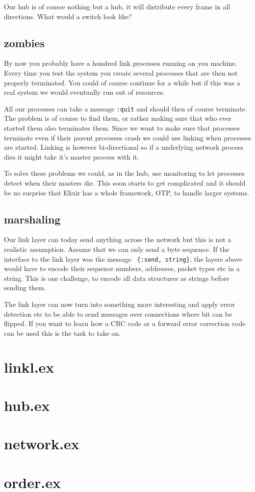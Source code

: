 \documentclass[a4paper,11pt]{article}
\begin{document}
Our hub is of course nothing but a hub, it will distribute every frame
in all directions. What would a switch look like?

\subsection{zombies}

By now you probably have a hundred link processes running on you
machine. Every time you test the system you create several processes
that are then not properly terminated. You could of course continue
for a while but if this was a real system we would eventually run out
of resources.

All our processes can take a message {\tt :quit} and should then of
course terminate. The problem is of course to find them, or rather
making sure that who ever started them also terminates them. Since we
want to make sure that processes terminate even if their parent
processes crash we could use linking when processes are
started. Linking is however bi-directional so if a underlying network
process dies it might take it's master process with it.

To solve these problems we could, as in the hub, use monitoring to let
processes detect when their masters die. This soon starts to get
complicated and it should be no surprise that Elixir has a whole
framework, OTP, to handle larger systems.

\subsection{marshaling}

Our link layer can today send anything across the network but this is
not a realistic assumption. Assume that we can only send a byte
sequence. If the interface to the link layer was the message {\tt
  \{:send, string\}}, the layers above would have to encode their
sequence numbers, addresses, packet types etc in a string. This is one
challenge, to encode all data structures as strings before sending
them.

The link layer can now turn into something more interesting and apply
error detection etc to be able to send messages over connections
where bit can be flipped. If you want to learn how a CRC code or a
forward error correction code can be used this is the task to take on.



\newpage
\appendix
\section{linkl.ex} \label{app:link}

\pagebreak
\section{hub.ex} \label{app:hub}

\pagebreak
\section{network.ex} \label{app:net}

\pagebreak
\section{order.ex} \label{app:order}

\pagebreak
\end{document}
